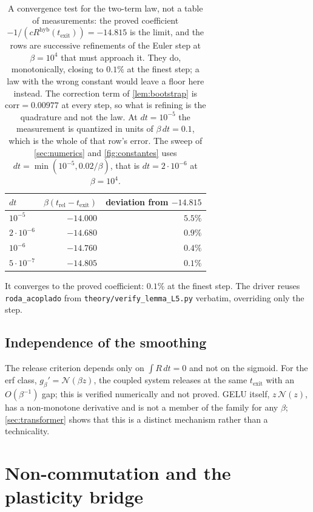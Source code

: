 \documentclass[11pt]{article}
\theoremstyle{definition}
\theoremstyle{remark}
\newcommand{\texit}{t_{\mathrm{exit}}}
\newcommand{\hyb}{\mathrm{hyb}}
\begin{document}
\begin{table}[h]
\centering
\caption{A convergence test for the two-term law, not a table of measurements:
the proved coefficient $-1/(cR^{\hyb}(\texit))=-14.815$ is the limit, and the
rows are successive refinements of the Euler step at $\beta=10^{4}$ that must
approach it. They do, monotonically, closing to $0.1\%$ at the finest step; a law
with the wrong constant would leave a floor here instead. The
correction term of \cref{lem:bootstrap} is $\mathrm{corr}=0.00977$ at every step,
so what is refining is the quadrature and not the law. At $dt=10^{-5}$ the
measurement is quantized in units of $\beta\,dt=0.1$, which is the whole of that
row's error. The sweep of \cref{sec:numerics} and \cref{fig:constantes} uses
$dt=\min(10^{-5},0.02/\beta)$, that is $dt=2\cdot10^{-6}$ at $\beta=10^{4}$.}
\label{tab:dt}
\begin{tabular}{lrr}
\toprule
$dt$ & $\beta(t_{\mathrm{rel}}-\texit)$ & deviation from $-14.815$ \\
\midrule
$10^{-5}$          & $-14.000$ & $5.5\%$ \\
$2\cdot10^{-6}$    & $-14.680$ & $0.9\%$ \\
$10^{-6}$          & $-14.760$ & $0.4\%$ \\
$5\cdot10^{-7}$    & $-14.805$ & $0.1\%$ \\
\bottomrule
\end{tabular}
\end{table}

\noindent It converges to the proved coefficient: $0.1\%$ at the finest step.
The driver reuses \texttt{roda\_acoplado} from
\texttt{theory/verify\_lemma\_L5.py} verbatim, overriding only the step.

\subsection{Independence of the smoothing}\label{sec:regularization}

The release criterion depends only on $\int R\,dt=0$ and not on the sigmoid. For
the erf class, $g_\beta'=\mathcal N(\beta z)$, the coupled system releases at the
same $\texit$ with an $O(\beta^{-1})$ gap; this is verified numerically and not
proved. GELU itself, $z\,\mathcal N(z)$, has a non-monotone derivative and is not
a member of the family for any $\beta$; \cref{sec:transformer} shows that this is
a distinct mechanism rather than a technicality.

\section{Non-commutation and the plasticity bridge}\label{sec:noncomm}
\end{document}
